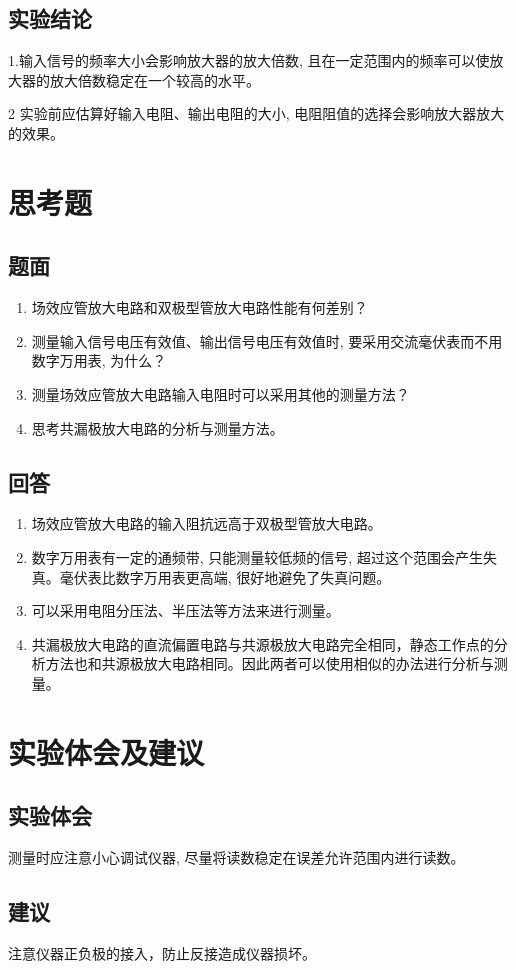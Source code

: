 \documentclass[10pt, a4paper]{article} %
\begin{document}
\subsection{实验结论}

1.输入信号的频率大小会影响放大器的放大倍数, 且在一定范围内的频率可以使放大器的放大倍数稳定在一个较高的水平。

2 实验前应估算好输入电阻、输出电阻的大小, 电阻阻值的选择会影响放大器放大的效果。

\section{思考题}
\subsection{题面}
\begin{enumerate}[leftmargin=50pt,label=(\arabic*)] %
    \item 场效应管放大电路和双极型管放大电路性能有何差别？
    \item 测量输入信号电压有效值、输出信号电压有效值时, 要采用交流毫伏表而不用数字万用表, 为什么？
    \item 测量场效应管放大电路输入电阻时可以采用其他的测量方法？
    \item 思考共漏极放大电路的分析与测量方法。
\end{enumerate}
\subsection{回答}

\begin{enumerate}[leftmargin=50pt,label=(\arabic*)] %
    \item 场效应管放大电路的输入阻抗远高于双极型管放大电路。
    \item 数字万用表有一定的通频带, 只能测量较低频的信号, 超过这个范围会产生失真。毫伏表比数字万用表更高端, 很好地避免了失真问题。
    \item 可以采用电阻分压法、半压法等方法来进行测量。
    \item 共漏极放大电路的直流偏置电路与共源极放大电路完全相同，静态工作点的分析方法也和共源极放大电路相同。因此两者可以使用相似的办法进行分析与测量。
\end{enumerate}

\section{实验体会及建议}
\subsection{实验体会}
测量时应注意小心调试仪器, 尽量将读数稳定在误差允许范围内进行读数。
\subsection{建议}
注意仪器正负极的接入，防止反接造成仪器损坏。
\end{document}

